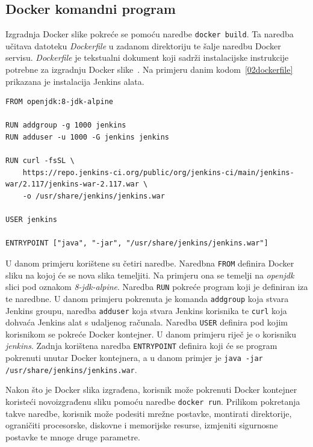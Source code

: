 \subsection{Docker komandni program}
Izgradnja Docker slike pokreće se pomoću naredbe \texttt{docker~build}. Ta naredba učitava datoteku
\textit{Dockerfile} u zadanom direktoriju te šalje naredbu Docker servisu. \textit{Dockerfile} je
tekstualni dokument koji sadrži instalacijske instrukcije potrebne za izgradnju Docker
slike~\citep{kacamarga2015lightweight}. Na primjeru danim kodom~\ref{02dockerfile} prikazana je
instalacija Jenkins alata.

\begin{lstlisting}[float=h]
FROM openjdk:8-jdk-alpine

RUN addgroup -g 1000 jenkins
RUN adduser -u 1000 -G jenkins jenkins

RUN curl -fsSL \
    https://repo.jenkins-ci.org/public/org/jenkins-ci/main/jenkins-war/2.117/jenkins-war-2.117.war \
    -o /usr/share/jenkins/jenkins.war

USER jenkins

ENTRYPOINT ["java", "-jar", "/usr/share/jenkins/jenkins.war"]
\end{lstlisting}

U danom primjeru korištene su četiri naredbe. Naredbna \texttt{FROM} definira Docker sliku na kojoj
će se nova slika temeljiti. Na primjeru ona se temelji na \textit{openjdk} slici pod oznakom
\textit{8-jdk-alpine}. Naredba \texttt{RUN} pokreće program koji je definiran iza te naredbne. U
danom primjeru pokrenuta je komanda \texttt{addgroup} koja stvara Jenkins groupu, naredba
\texttt{adduser} koja stvara Jenkins korisnika te \texttt{curl} koja dohvaća Jenkins alat s
udaljenog računala.  Naredba \texttt{USER} definira pod kojim korisnikom se pokreće Docker
kontejner. U danom primjeru riječ je o  korisniku \textit{jenkins}. Zadnja korištena naredba
\texttt{ENTRYPOINT} definira koji će se program pokrenuti unutar Docker kontejnera, a u danom
primjer je \texttt{java -jar /usr/share/jenkins/jenkins.war}.

Nakon što je Docker slika izgrađena, korisnik može pokrenuti Docker kontejner koristeći
novoizgrađenu sliku pomoću naredbe \texttt{docker~run}. Prilikom pokretanja takve naredbe, korisnik
može podesiti mrežne postavke, montirati direktorije, ograničiti procesorske, diskovne i memorijske
resurse, izmjeniti sigurnosne postavke te mnoge druge parametre.

